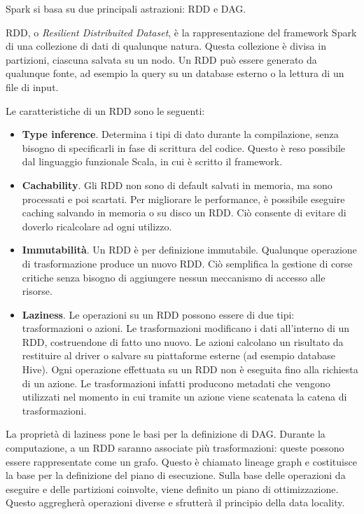 Spark si basa su due principali astrazioni: RDD e DAG.

RDD, o \textit{Resilient Distribuited Dataset}, è la rappresentazione del framework Spark di una collezione di dati di qualunque natura.
Questa collezione è divisa in partizioni, ciascuna salvata su un nodo.
Un RDD può essere generato da qualunque fonte, ad esempio la query su un database esterno o la lettura di un file di input.

Le caratteristiche di un RDD sono le seguenti:

\begin{itemize}
    \item \textbf{Type inference}.
    Determina i tipi di dato durante la compilazione, senza bisogno di specificarli in fase di scrittura del codice.
    Questo è reso possibile dal linguaggio funzionale Scala, in cui è scritto il framework.
    
    \item \textbf{Cachability}.
    Gli RDD non sono di default salvati in memoria, ma sono processati e poi scartati.
    Per migliorare le performance, è possibile eseguire caching salvando in memoria o su disco un RDD.
    Ciò consente di evitare di doverlo ricalcolare ad ogni utilizzo.
    
    \item \textbf{Immutabilità}.
    Un RDD è per definizione immutabile.
    Qualunque operazione di trasformazione produce un nuovo RDD.
    Ciò semplifica la gestione di corse critiche senza bisogno di aggiungere nessun meccanismo di accesso alle risorse.
    
    \item \textbf{Laziness}.
    Le operazioni su un RDD possono essere di due tipi: trasformazioni o azioni.
    Le trasformazioni modificano i dati all'interno di un RDD, costruendone di fatto uno nuovo.
    Le azioni calcolano un risultato da restituire al driver o salvare su piattaforme esterne (ad esempio database Hive).
    Ogni operazione effettuata su un RDD non è eseguita fino alla richiesta di un azione.
    Le trasformazioni infatti producono metadati che vengono utilizzati nel momento in cui tramite un azione viene scatenata la catena di trasformazioni.

\end{itemize}

La proprietà di laziness pone le basi per la definizione di DAG.
Durante la computazione, a un RDD saranno associate più trasformazioni: queste possono essere rappresentate come un grafo.
Questo è chiamato lineage graph e costituisce la base per la definizione del piano di esecuzione.
Sulla base delle operazioni da eseguire e delle partizioni coinvolte, viene definito un piano di ottimizzazione.
Questo aggregherà operazioni diverse e sfrutterà il principio della data locality.

